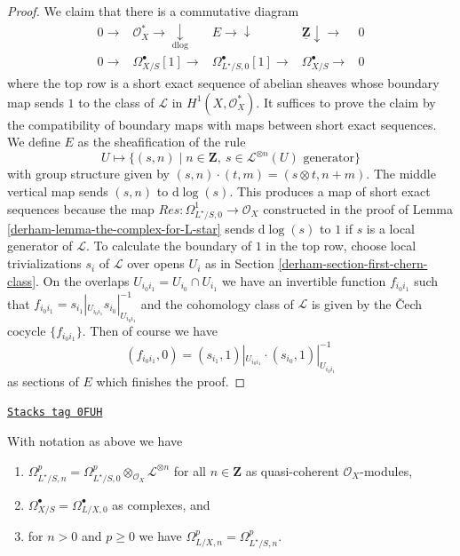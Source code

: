 \begin{proof}
\medskip\noindent
We claim that there is a commutative diagram
$$
\begin{array}{ccccc}0 \longrightarrow & \mathcal{O}_X^* \longrightarrow\underset{\text{d}\log}{\downarrow} & E \longrightarrow\downarrow & \underline{\mathbf{Z}} \downarrow\longrightarrow & 0 \\ 0 \longrightarrow & \Omega^\bullet_{X/S}[1] \longrightarrow & \Omega^\bullet_{L^\star/S, 0}[1] \longrightarrow & \Omega^\bullet_{X/S} \longrightarrow & 0\end{array}
$$
where the top row is a short exact sequence of abelian sheaves whose
boundary map sends $1$ to the class of $\mathcal{L}$ in
$H^1(X, \mathcal{O}_X^*)$. It suffices to prove the claim
by the compatibility of boundary maps with maps between short
exact sequences. We define $E$ as the sheafification of the rule
$$
U \longmapsto \{(s, n) \mid
n \in \mathbf{Z},\ s \in \mathcal{L}^{\otimes n}(U)\text{ generator}\}
$$
with group structure given by $(s, n) \cdot (t, m) = (s \otimes t, n + m)$.
The middle vertical map sends $(s, n)$ to $\text{d}\log(s)$. This produces
a map of short exact sequences
because the map $Res : \Omega^1_{L^\star/S, 0} \to \mathcal{O}_X$
constructed in the proof of Lemma \ref{derham-lemma-the-complex-for-L-star} sends
$\text{d}\log(s)$ to $1$ if $s$ is a local generator of $\mathcal{L}$.
To calculate the boundary of $1$ in the top row, choose local trivializations
$s_i$ of $\mathcal{L}$ over opens $U_i$ as in
Section \ref{derham-section-first-chern-class}. On the overlaps
$U_{i_0i_1} = U_{i_0} \cap U_{i_1}$
we have an invertible function $f_{i_0i_1}$ such that
$f_{i_0i_1} = s_{i_1}|_{U_{i_0i_1}} s_{i_0}|_{U_{i_0i_1}}^{-1}$
and the cohomology class of $\mathcal{L}$ is given by the {\v C}ech cocycle
$\{f_{i_0i_1}\}$. Then of course we have
$$
(f_{i_0i_1}, 0) = (s_{i_1}, 1)|_{U_{i_0i_1}} \cdot
(s_{i_0}, 1)|_{U_{i_0i_1}}^{-1}
$$
as sections of $E$ which finishes the proof.
\end{proof}

\begin{lemma}
\label{derham-lemma-push-omega-a}
\href{https://stacks.math.columbia.edu/tag/0FUH}{\texttt{Stacks tag 0FUH}}

With notation as above we have
\begin{enumerate}
\item $\Omega^p_{L^\star/S, n} =
\Omega^p_{L^\star/S, 0} \otimes_{\mathcal{O}_X} \mathcal{L}^{\otimes n}$
for all $n \in \mathbf{Z}$ as quasi-coherent $\mathcal{O}_X$-modules,
\item $\Omega^\bullet_{X/S} = \Omega^\bullet_{L/X, 0}$
as complexes, and
\item for $n > 0$ and $p \geq 0$ we have
$\Omega^p_{L/X, n} = \Omega^p_{L^\star/S, n}$.
\end{enumerate}
\end{lemma}

